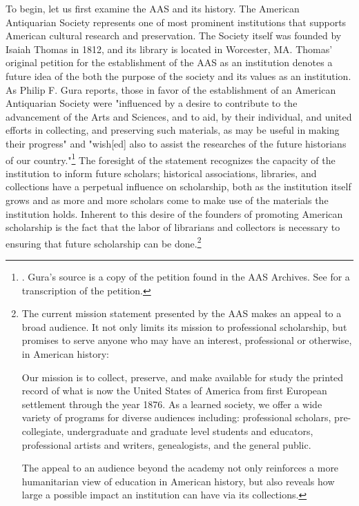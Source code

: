 To begin, let us first examine the AAS and its history. The American Antiquarian Society represents one of most prominent institutions that supports American cultural research and preservation. The Society itself was founded by Isaiah Thomas in 1812, and its library is located in Worcester, MA. Thomas' original petition for the establishment of the AAS as an institution denotes a future idea of the both the purpose of the society and its values as an institution. As Philip F. Gura reports, those in favor of the establishment of an American Antiquarian Society were "influenced by a desire to contribute to the advancement of the Arts and Sciences, and to aid, by their individual, and united efforts in collecting, and preserving such materials, as may be useful in making their progress" and "wish[ed] also to assist the researches of the future historians of our country."\footnote{\autocite[19]{gura_american_2012}. Gura's source is a copy of the petition found in the AAS Archives. See \autocite[11-14]{society_account_1813} for a transcription of the petition.} The foresight of the statement recognizes the capacity of the institution to inform future scholars; historical associations, libraries, and collections have a perpetual influence on scholarship, both as the institution itself grows and as more and more scholars come to make use of the materials the institution holds. Inherent to this desire of the founders of promoting American scholarship is the fact that the labor of librarians and collectors is necessary to ensuring that future scholarship can be done.\footnote{The current mission statement presented by the AAS makes an appeal to a broad audience. It not only limits its mission to professional scholarship, but promises to serve anyone who may have an interest, professional or otherwise, in American history:
\begin{displayquote}
Our mission is to collect, preserve, and make available for study the printed record of what is now the United States of America from first European settlement through the year 1876. As a learned society, we offer a wide variety of programs for diverse audiences including: professional scholars, pre-collegiate, undergraduate and graduate level students and educators, professional artists and writers, genealogists, and the general public.\autocite{noauthor_mission_2017}
\end{displayquote}
The appeal to an audience beyond the academy not only reinforces a more humanitarian view of education in American history, but also reveals how large a possible impact an institution can have via its collections.}

